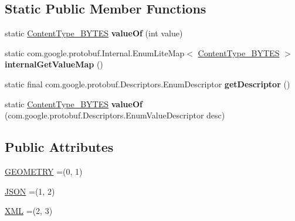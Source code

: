 \subsection*{Static Public Member Functions}
\begin{DoxyCompactItemize}
\item 
\mbox{\label{enumcom_1_1mysql_1_1cj_1_1x_1_1protobuf_1_1_mysqlx_resultset_1_1_content_type___b_y_t_e_s_af038bca794f2bdff11aea0b8cc925e75}} 
static \mbox{\hyperlink{enumcom_1_1mysql_1_1cj_1_1x_1_1protobuf_1_1_mysqlx_resultset_1_1_content_type___b_y_t_e_s}{Content\+Type\+\_\+\+B\+Y\+T\+ES}} {\bfseries value\+Of} (int value)
\item 
\mbox{\label{enumcom_1_1mysql_1_1cj_1_1x_1_1protobuf_1_1_mysqlx_resultset_1_1_content_type___b_y_t_e_s_afd9ec08687cc30b3162eea70faeea54e}} 
static com.\+google.\+protobuf.\+Internal.\+Enum\+Lite\+Map$<$ \mbox{\hyperlink{enumcom_1_1mysql_1_1cj_1_1x_1_1protobuf_1_1_mysqlx_resultset_1_1_content_type___b_y_t_e_s}{Content\+Type\+\_\+\+B\+Y\+T\+ES}} $>$ {\bfseries internal\+Get\+Value\+Map} ()
\item 
\mbox{\label{enumcom_1_1mysql_1_1cj_1_1x_1_1protobuf_1_1_mysqlx_resultset_1_1_content_type___b_y_t_e_s_a6fb51ec8d254769046b5e081c562aed3}} 
static final com.\+google.\+protobuf.\+Descriptors.\+Enum\+Descriptor {\bfseries get\+Descriptor} ()
\item 
\mbox{\label{enumcom_1_1mysql_1_1cj_1_1x_1_1protobuf_1_1_mysqlx_resultset_1_1_content_type___b_y_t_e_s_a1835fa3047f486fab6c10b4bfefaa070}} 
static \mbox{\hyperlink{enumcom_1_1mysql_1_1cj_1_1x_1_1protobuf_1_1_mysqlx_resultset_1_1_content_type___b_y_t_e_s}{Content\+Type\+\_\+\+B\+Y\+T\+ES}} {\bfseries value\+Of} (com.\+google.\+protobuf.\+Descriptors.\+Enum\+Value\+Descriptor desc)
\end{DoxyCompactItemize}
\subsection*{Public Attributes}
\begin{DoxyCompactItemize}
\item 
\mbox{\hyperlink{enumcom_1_1mysql_1_1cj_1_1x_1_1protobuf_1_1_mysqlx_resultset_1_1_content_type___b_y_t_e_s_a2f05973734af4ee7e389c32aa11c9a90}{G\+E\+O\+M\+E\+T\+RY}} =(0, 1)
\item 
\mbox{\hyperlink{enumcom_1_1mysql_1_1cj_1_1x_1_1protobuf_1_1_mysqlx_resultset_1_1_content_type___b_y_t_e_s_a3568694876b4e121a253985b374f1f88}{J\+S\+ON}} =(1, 2)
\item 
\mbox{\hyperlink{enumcom_1_1mysql_1_1cj_1_1x_1_1protobuf_1_1_mysqlx_resultset_1_1_content_type___b_y_t_e_s_aad070c4b8803fae679a573e2c5088de5}{X\+ML}} =(2, 3)
\end{DoxyCompactItemize}

